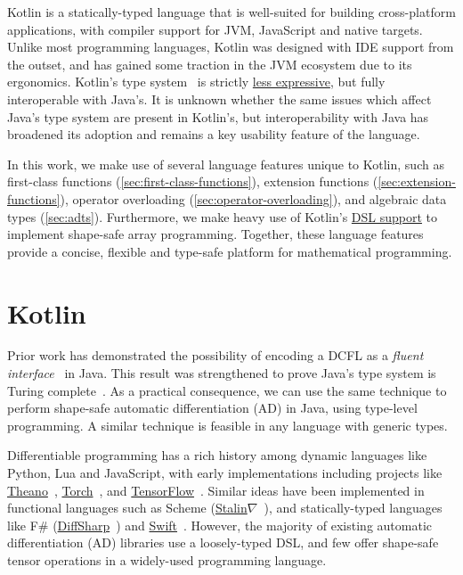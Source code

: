 \documentclass[12pt,initial,twoside,maitrise]{dms}
\numberwithin{equation}{section}
\numberwithin{table}{chapter}
\numberwithin{figure}{chapter}
\begin{document}
Kotlin is a statically-typed language that is well-suited for building cross-platform applications, with compiler support for JVM, JavaScript and native targets. Unlike most programming languages, Kotlin was designed with IDE support from the outset, and has gained some traction in the JVM ecosystem due to its ergonomics. Kotlin's type system~\citep{tate2013mixed} is strictly \href{https://kotlinlang.org/docs/reference/generics.html#variance}{less expressive}, but fully interoperable with Java's. It is unknown whether the same issues which affect Java's type system are present in Kotlin's, but interoperability with Java has broadened its adoption and remains a key usability feature of the language.

In this work, we make use of several language features unique to Kotlin, such as first-class functions (\autoref{sec:first-class-functions}), extension functions (\autoref{sec:extension-functions}), operator overloading (\autoref{sec:operator-overloading}), and algebraic data types (\autoref{sec:adts}). Furthermore, we make heavy use of Kotlin's \href{https://kotlinlang.org/docs/reference/type-safe-builders.html}{DSL support} to implement shape-safe array programming. Together, these language features provide a concise, flexible and type-safe platform for mathematical programming.

\section{Kotlin\textorpdfstring{$\nabla$}}\label{sec:kotlingrad}

Prior work has demonstrated the possibility of encoding a DCFL as a \textit{fluent interface}~\citep{gil2016formal, nakamaru2017silverchain} in Java. This result was strengthened to prove Java's type system is Turing complete~\citep{grigore2017java}. As a practical consequence, we can use the same technique to perform shape-safe automatic differentiation (AD) in Java, using type-level programming. A similar technique is feasible in any language with generic types.

Differentiable programming has a rich history among dynamic languages like Python, Lua and JavaScript, with early implementations including projects like \href{http://deeplearning.net/software/theano/}{Theano}~\citep{bergstra2010theano}, \href{http://torch.ch/}{Torch}~\citep{collobert2002torch}, and \href{http://tensorflow.org/}{TensorFlow}~\citep{abadi2016tensorflow}. Similar ideas have been implemented in functional languages such as Scheme (\href{https://github.com/Functional-AutoDiff/STALINGRAD}{Stalin$\nabla$}~\citep{pearlmutter2008using}), and statically-typed languages like F\# (\href{http://diffsharp.github.io/DiffSharp/}{DiffSharp}~\citep{baydin2015diffsharp}) and \href{https://www.tensorflow.org/swift}{Swift}~\citep{lattner2018tensorflow}. However, the majority of existing automatic differentiation (AD) libraries use a loosely-typed DSL, and few offer shape-safe tensor operations in a widely-used programming language.
\end{document}
